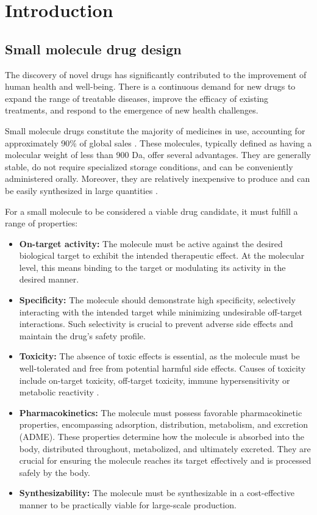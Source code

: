 \chapter{Introduction\label{chap:introduction}}
\section{Small molecule drug design\label{sec:drug-design}}

The discovery of novel drugs has significantly contributed to the improvement of human health and
well-being. There is a continuous demand for new drugs to expand the range of treatable diseases,
improve the efficacy of existing treatments, and respond to the emergence of new health challenges.

Small molecule drugs constitute the majority of medicines in use, accounting for approximately 90\%
of global sales \citep{makurvetBiologicsVsSmall2021}. These molecules, typically defined as having a
molecular weight of less than 900 Da, offer several advantages. They are generally stable, do not
require specialized storage conditions, and can be conveniently administered orally. Moreover, they
are relatively inexpensive to produce and can be easily synthesized in large quantities
\citep{southeyIntroductionSmallMolecule2023}.

For a small molecule to be considered a viable drug candidate, it must fulfill a range of properties:
\begin{itemize}
	\item \textbf{On-target activity:} The molecule must be active against the desired biological target to exhibit
	      the intended therapeutic effect. At the molecular level, this means binding to the target or
	      modulating its activity in the desired manner.
	\item \textbf{Specificity:} The molecule should demonstrate high specificity, selectively
	      interacting with the intended target while minimizing undesirable off-target interactions. Such
	      selectivity is crucial to prevent adverse side effects and maintain the drug's safety profile.
	\item \textbf{Toxicity:} The absence of toxic effects is essential, as the molecule must be
	      well-tolerated and free from potential harmful side effects. Causes of toxicity include
	      on-target toxicity, off-target toxicity, immune hypersensitivity or metabolic reactivity
	      \citep{guengerichMechanismsDrugToxicity2011}.
	\item \textbf{Pharmacokinetics:} The molecule must possess favorable pharmacokinetic properties,
	      encompassing adsorption, distribution, metabolism, and excretion (ADME). These properties determine
	      how the molecule is absorbed into the body, distributed throughout, metabolized, and ultimately
	      excreted. They are crucial for ensuring the molecule reaches its target effectively and is processed
	      safely by the body.
	\item \textbf{Synthesizability:} The molecule must be synthesizable in a cost-effective manner to be
	      practically viable for large-scale production.
\end{itemize}


